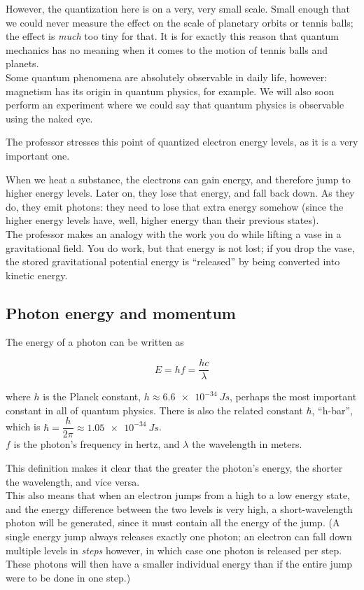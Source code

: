 However, the quantization here is on a very, very small scale. Small enough that we could never measure the effect on the scale of planetary orbits or tennis balls; the effect is \emph{much} too tiny for that. It is for exactly this reason that quantum mechanics has no meaning when it comes to the motion of tennis balls and planets.\\
Some quantum phenomena are absolutely observable in daily life, however: magnetism has its origin in quantum physics, for example. We will also soon perform an experiment where we could say that quantum physics is observable using the naked eye.

The professor stresses this point of quantized electron energy levels, as it is a very important one.

When we heat a substance, the electrons can gain energy, and therefore jump to higher energy levels. Later on, they lose that energy, and fall back down. As they do, they emit photons: they need to lose that extra energy somehow (since the higher energy levels have, well, higher energy than their previous states).\\
The professor makes an analogy with the work you do while lifting a vase in a gravitational field. You do work, but that energy is not lost; if you drop the vase, the stored gravitational potential energy is ``released'' by being converted into kinetic energy.

\subsection{Photon energy and momentum}

The energy of a photon can be written as

\begin{equation}
E = h f = \frac{h c}{\lambda}
\end{equation}

where $h$ is the Planck constant, $h \approx \SI{6.6e-34}{J s}$, perhaps the most important constant in all of quantum physics. There is also the related constant $\hbar$, ``h-bar'', which is $\hbar = \dfrac{h}{2\pi} \approx \SI{1.05e-34}{J s}$.\\
$f$ is the photon's frequency in hertz, and $\lambda$ the wavelength in meters.

This definition makes it clear that the greater the photon's energy, the shorter the wavelength, and vice versa.\\
This also means that when an electron jumps from a high to a low energy state, and the energy difference between the two levels is very high, a short-wavelength photon will be generated, since it must contain all the energy of the jump. (A single energy jump always releases exactly one photon; an electron can fall down multiple levels in \emph{steps} however, in which case one photon is released per step. These photons will then have a smaller individual energy than if the entire jump were to be done in one step.)


